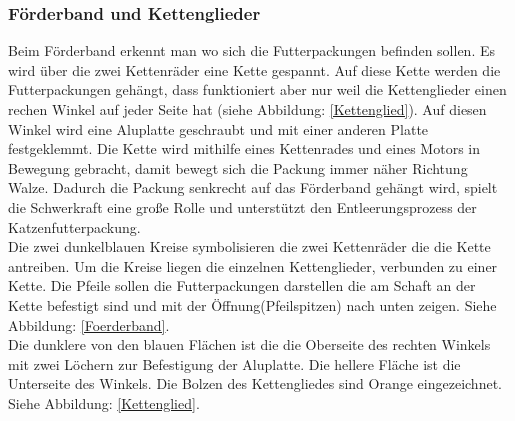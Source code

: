 \subsubsection{Förderband und Kettenglieder}

Beim Förderband erkennt man wo sich die Futterpackungen befinden sollen. Es wird über die zwei Kettenräder eine Kette gespannt. Auf diese Kette werden die Futterpackungen gehängt, dass funktioniert aber nur weil die Kettenglieder einen rechen Winkel auf jeder Seite hat (siehe Abbildung: \ref{Kettenglied}). Auf diesen Winkel wird eine Aluplatte geschraubt und mit einer anderen Platte festgeklemmt. Die Kette wird mithilfe eines Kettenrades und eines Motors in Bewegung gebracht, damit bewegt sich die Packung immer näher Richtung Walze. Dadurch die Packung senkrecht auf das Förderband gehängt wird, spielt die Schwerkraft eine große Rolle und unterstützt den Entleerungsprozess der Katzenfutterpackung.\\ Die zwei dunkelblauen Kreise symbolisieren die zwei Kettenräder die die Kette antreiben. Um die Kreise liegen die einzelnen Kettenglieder, verbunden zu einer Kette. Die Pfeile sollen die Futterpackungen darstellen die am Schaft an der Kette befestigt sind und mit der Öffnung(Pfeilspitzen) nach unten zeigen. Siehe Abbildung: \ref{Foerderband}. \\
Die dunklere von den blauen Flächen ist die die Oberseite des rechten Winkels mit zwei Löchern zur Befestigung der Aluplatte. Die hellere Fläche ist die Unterseite des Winkels. Die Bolzen des Kettengliedes sind Orange eingezeichnet. Siehe Abbildung: \ref{Kettenglied}.

